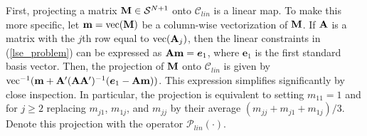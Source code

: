 \documentclass[11pt]{article}
\newcommand{\R}{\mathbb{R}}
\theoremstyle{definition}
\theoremstyle{definition}
\def\s{{\bf s}}
\def\m{{\bf m}}
\def\A{{\bf A}}
\def\M{{\bf M}}
\def\vec{\text{vec}}
\begin{document}





First, projecting a matrix $\M \in \mathcal{S}^{N+1}$  onto $\mathcal{C}_{lin}$ is a linear map. To make this more specific, let $\m = \vec(\M)$ be a column-wise vectorization of $\M$. 
If $\A$ is a matrix with the $j$th row equal to $\vec(\A_j)$, then the  linear constraints in (\ref{lse_problem}) can be expressed as $\A\m =  \boldsymbol{e}_1$, where $\boldsymbol{e}_1$ is the first standard basis vector. Then, the projection of  $\M$ onto $\mathcal{C}_{lin}$ is given by $\vec^{-1}(\m + \A' (\A \A')^{-1}(\boldsymbol{e}_1 - \A\m))$. This expression simplifies significantly by close inspection. In particular, the projection is equivalent to setting $m_{11} = 1$ and for $j \geq 2$ replacing $m_{j1}$, $m_{1j}$, and $m_{jj}$ by their average $(m_{jj} + m_{j1} + m_{1j})/3$. Denote this projection with the operator $\mathcal{P}_{lin}(\cdot)$. 
\end{document}
